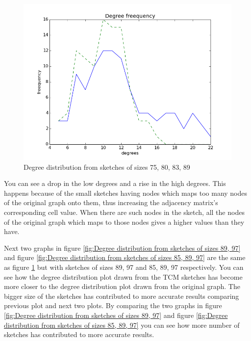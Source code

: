 \documentclass[conference]{IEEEtran}
\begin{document}
\begin{figure}[!t]
\centering
\includegraphics[width=\linewidth]{dd1}
\caption{Degree distribution from sketches of sizes 75, 80, 83, 89}
\label{fig:Degree distribution from sketches of sizes 75, 80, 83, 89}
\end{figure}

You can see a drop in the low degrees and a rise in the high degrees. This happens because of the small sketches having nodes which maps too many nodes of the original graph onto them, thus increasing the adjacency matrix’s corresponding cell value. When there are such nodes in the sketch, all the nodes of the original graph which maps to those nodes gives a higher values than they have. 


Next two graphs in figure \ref{fig:Degree distribution from sketches of sizes 89, 97} and figure \ref{fig:Degree distribution from sketches of sizes 85, 89, 97} are the same as figure \ref{fig:Degree distribution from sketches of sizes 75, 80, 83, 89} but with sketches  of sizes 89, 97 and 85, 89, 97 respectively. You can see how the degree distribution plot drawn from the TCM sketches has become more closer to the degree distribution plot drawn from the original graph. The bigger size of the sketches has contributed to more accurate results comparing previous plot and next two plots. By comparing the two graphs in figure \ref{fig:Degree distribution from sketches of sizes 89, 97} and figure \ref{fig:Degree distribution from sketches of sizes 85, 89, 97} you can see how more number of sketches has contributed to more accurate results.
\end{document}
